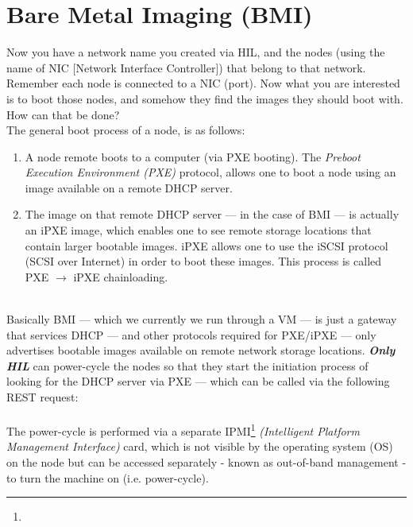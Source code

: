 \section{Bare Metal Imaging (BMI)}

Now you have a network name you created via HIL, and the nodes (using the name of NIC [Network Interface Controller]) that belong to that network.  Remember each node is connected to a NIC (port).  Now what you are interested is to boot those nodes, and somehow they find the images they should boot with.  How can that be done? \\

The general boot process of a node, is as follows: \\

\begin{enumerate}

\item A node remote boots to a computer (via PXE booting). The \emph{Preboot Execution Environment (PXE)} protocol, allows one to boot a node using an image available on a remote DHCP server. \\

\item The image on that remote DHCP server --- in the case of BMI --- is actually an iPXE image, which enables one to see remote storage locations that contain larger bootable images.  iPXE allows one to use the iSCSI protocol (SCSI over Internet) in order to boot these images.  This process is called PXE $\rightarrow$ iPXE chainloading.

\end{enumerate}

\text{} \\

Basically BMI --- which we currently we run through a VM --- is just a gateway that services DHCP --- and other protocols required for PXE/iPXE --- only advertises bootable images available on remote network storage locations.  \textbf{\emph{Only HIL}} can power-cycle the nodes so that they start the initiation process of looking for the DHCP server via PXE --- which can be called via the following REST request: \\

  \\
 
\noindent  The power-cycle is performed via a separate IPMI\footnote{} \emph{(Intelligent Platform Management Interface)} card, which is not visible by the operating system (OS) on the node but can be accessed separately - known as out-of-band management - to turn the machine on (i.e. power-cycle).  

